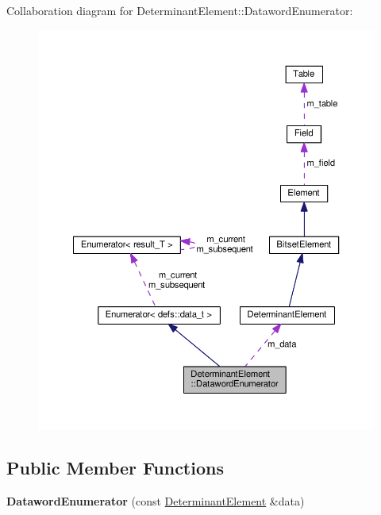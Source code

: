 Collaboration diagram for Determinant\+Element\+:\+:Dataword\+Enumerator\+:\nopagebreak
\begin{figure}[H]
\begin{center}
\leavevmode
\includegraphics[width=350pt]{classDeterminantElement_1_1DatawordEnumerator__coll__graph}
\end{center}
\end{figure}
\subsection*{Public Member Functions}
\begin{DoxyCompactItemize}
\item 
{\bfseries Dataword\+Enumerator} (const \hyperlink{classDeterminantElement}{Determinant\+Element} \&data)\hypertarget{classDeterminantElement_1_1DatawordEnumerator_a17237d87203d5ad9874dd2326858f061}{}\label{classDeterminantElement_1_1DatawordEnumerator_a17237d87203d5ad9874dd2326858f061}

\end{DoxyCompactItemize}
